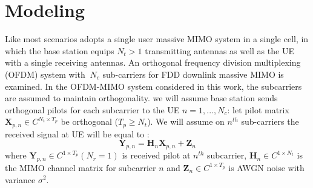 \documentclass[lettersize,journal]{IEEEtran}
\begin{document}
\section{Modeling}

Like most scenarios adopts a single user massive MIMO system in a single cell, in which the base station equips
\begin{math} N_{t} > 1\end{math} transmitting antennas as well as the UE with a single
receiving antennas. An orthogonal frequency division multiplexing (OFDM) system with \begin{math}\ N_{c}\end{math} sub-carriers for FDD downlink massive MIMO is examined. In the OFDM-MIMO system considered in this work, the subcarriers are assumed to maintain orthogonality. 
we will assume base station sends orthogonal pilots for each subcarrier to the UE 
\begin{math}
	n=1,...,N_{c}
\end{math}: let pilot matrix
\begin{math} \textbf{X}_{p,n}\in C^{N_{t}\times T_{p}}  \end{math} be orthogonal
(\begin{math}
	T_{p} \geq N_{t}
\end{math}).
We will assume on  \begin{math}  {n^{th}} \end{math} sub-carriers the received signal at UE will be equal to : 
\begin{equation}
	\textbf{Y}_{p,n}=\textbf{H}_{n}\textbf{X}_{p,n}+\textbf{Z}_{n} 
\end{equation}
where 
\begin{math}
	\textbf{Y}_{p,n} \in C^{1\times T_{p}}
(N_{r}=1)
\end{math} is received pilot at \begin{math}  {n^{th}} \end{math} subcarrier,  
\begin{math}
	\textbf{H}_{n} \in  C^{1\times N_{t}}
\end{math} is the MIMO channel matrix for subcarrier \begin{math} n \end{math}
and \begin{math} \textbf{Z}_{n}\in C^{1\times T_{p}} \end{math} is AWGN noise with variance \begin{math}  \sigma^{2} \end{math}.
\end{document}
